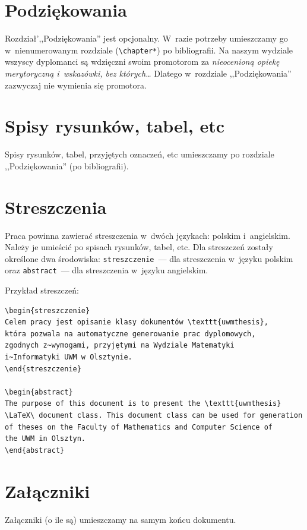 \documentclass[wmii, inf, mgr]{uwmthesis}
\begin{document}
\section{Podziękowania}
Rozdział',,Podziękowania'' jest opcjonalny. 
W~razie potrzeby umieszczamy go w~nienumerowanym rozdziale (\verb|\chapter*|) po bibliografii. Na naszym wydziale wszyscy dyplomanci są wdzięczni swoim promotorom za \emph{nieocenioną opiekę merytoryczną i~wskazówki, bez których\dots} Dlatego w~rozdziale ,,Podziękowania'' zazwyczaj nie wymienia się promotora.

\section{Spisy rysunków, tabel, etc}
Spisy rysunków, tabel, przyjętych oznaczeń, etc umieszczamy po rozdziale ,,Podziękowania'' (po bibliografii).

\section{Streszczenia}
Praca powinna zawierać streszczenia w~dwóch językach: polskim i~angielskim.  Należy je umieścić po spisach rysunków, tabel, etc. Dla streszczeń zostały określone dwa środowiska: \texttt{streszczenie}~--- dla streszczenia w~języku polskim oraz \texttt{abstract}~--- dla streszczenia w~języku angielskim.

Przykład streszczeń:
\begin{verbatim}
\begin{streszczenie}
Celem pracy jest opisanie klasy dokumentów \texttt{uwmthesis},
która pozwala na automatyczne generowanie prac dyplomowych,
zgodnych z~wymogami, przyjętymi na Wydziale Matematyki
i~Informatyki UWM w Olsztynie.
\end{streszczenie}

\begin{abstract}
The purpose of this document is to present the \texttt{uwmthesis}
\LaTeX\ document class. This document class can be used for generation
of theses on the Faculty of Mathematics and Computer Science of
the UWM in Olsztyn.
\end{abstract}
\end{verbatim}


\section{Załączniki}
Załączniki (o ile są) umieszczamy na samym końcu dokumentu.
\end{document}
